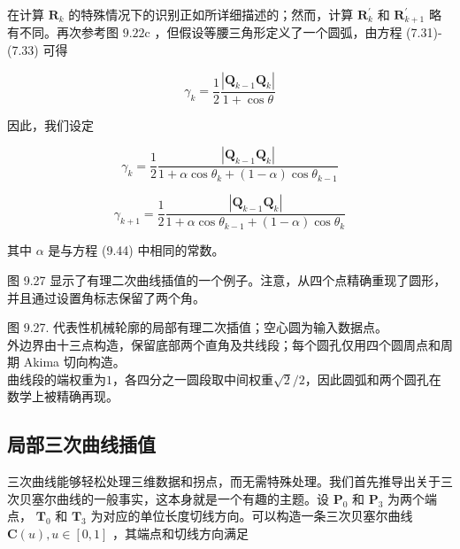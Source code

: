 \documentclass[../main.tex]{subfiles}
\begin{document}
在计算 \({\mathbf{R}}_{k}\) 的特殊情况下的识别正如所详细描述的；然而，计算 \({\mathbf{R}}_{k}^{\prime }\) 和 \({\mathbf{R}}_{k + 1}^{\prime }\) 略有不同。再次参考图 \({9.22}\mathrm{c}\) ，但假设等腰三角形定义了一个圆弧，由方程 (7.31)-(7.33) 可得

\[
{\gamma }_{k} = \frac{1}{2}\frac{\left| {\mathbf{Q}}_{k - 1}{\mathbf{Q}}_{k}\right| }{1 + \cos \theta }
\]

因此，我们设定

\[
{\gamma }_{k} = \frac{1}{2}\frac{\left| {\mathbf{Q}}_{k - 1}{\mathbf{Q}}_{k}\right| }{1 + \alpha \cos {\theta }_{k} + \left( {1 - \alpha }\right) \cos {\theta }_{k - 1}}
\]

\[
{\gamma }_{k + 1} = \frac{1}{2}\frac{\left| {\mathbf{Q}}_{k - 1}{\mathbf{Q}}_{k}\right| }{1 + \alpha \cos {\theta }_{k - 1} + \left( {1 - \alpha }\right) \cos {\theta }_{k}} \tag{9.45}
\]

其中 \(\alpha\) 是与方程 (9.44) 中相同的常数。



图 9.27 显示了有理二次曲线插值的一个例子。注意，从四个点精确重现了圆形，并且通过设置角标志保留了两个角。


\begin{center}
\begin{minipage}{29cm}
\vspace*{.6\baselineskip}
\centering
{}
\par\smallskip
图 9.27. 代表性机械轮廓的局部有理二次插值；空心圆为输入数据点。\\
外边界由十三点构造，保留底部两个直角及共线段；每个圆孔仅用四个圆周点和周期 Akima 切向构造。\\
曲线段的端权重为$1$，各四分之一圆段取中间权重$\sqrt2/2$，因此圆弧和两个圆孔在数学上被精确再现。
\end{minipage}
\end{center}

\subsection{局部三次曲线插值}
三次曲线能够轻松处理三维数据和拐点，而无需特殊处理。我们首先推导出关于三次贝塞尔曲线的一般事实，这本身就是一个有趣的主题。设 \({\mathbf{P}}_{0}\) 和 \({\mathbf{P}}_{3}\) 为两个端点， \({\mathbf{T}}_{0}\) 和 \({\mathbf{T}}_{3}\) 为对应的单位长度切线方向。可以构造一条三次贝塞尔曲线 \(\mathbf{C}\left( u\right) ,u \in  \left\lbrack  {0,1}\right\rbrack\) ，其端点和切线方向满足
\end{document}
